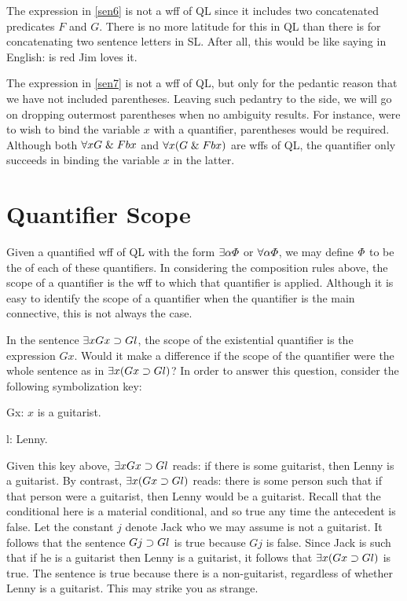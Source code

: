 The expression in \ref{sen6} is not a wff of QL since it includes two concatenated predicates $F$ and $G$.
There is no more latitude for this in QL than there is for concatenating two sentence letters in SL.
After all, this would be like saying in English: is red Jim loves it. 

The expression in \ref{sen7} is not a wff of QL, but only for the pedantic reason that we have not included parentheses.
Leaving such pedantry to the side, we will go on dropping outermost parentheses when no ambiguity results.
For instance, were to wish to bind the variable $x$ with a quantifier, parentheses would be required.
Although both $\forall x G \mathrel\& Fbx$ and $\forall x(G \mathrel\& Fbx)$ are wffs of QL, the quantifier only succeeds in binding the variable $x$ in the latter.






\section{Quantifier Scope}

Given a quantified wff of QL with the form $\exists \alpha\varPhi$ or $\forall \alpha\varPhi$, we may define $\varPhi$ to be the  of each of these quantifiers.
In considering the composition rules above, the scope of a quantifier is the wff to which that quantifier is applied.
Although it is easy to identify the scope of a quantifier when the quantifier is the main connective, this is not always the case.

In the sentence $\exists x Gx \supset Gl$, the scope of the existential quantifier is the expression $Gx$.
Would it make a difference if the scope of the quantifier were the whole sentence as in $\exists x(Gx \supset Gl)$?
In order to answer this question, consider the following symbolization key:

\begin{ekey}
\item[Gx:] $x$ is a guitarist.
\item[l:] Lenny.
\end{ekey}

Given this key above, $\exists x Gx \supset Gl$ reads: if there is some guitarist, then Lenny is a guitarist.
By contrast, $\exists x (Gx \supset Gl)$ reads: there is some person such that if that person were a guitarist, then Lenny would be a guitarist.
Recall that the conditional here is a material conditional, and so true any time the antecedent is false.
Let the constant $j$ denote Jack who we may assume is not a guitarist.
It follows that the sentence $Gj \supset Gl$ is true because $Gj$ is false.
Since Jack is such that if he is a guitarist then Lenny is a guitarist, it follows that $\exists x (Gx \supset Gl)$ is true.
The sentence is true because there is a non-guitarist, regardless of whether Lenny is a guitarist.
This may strike you as strange.


